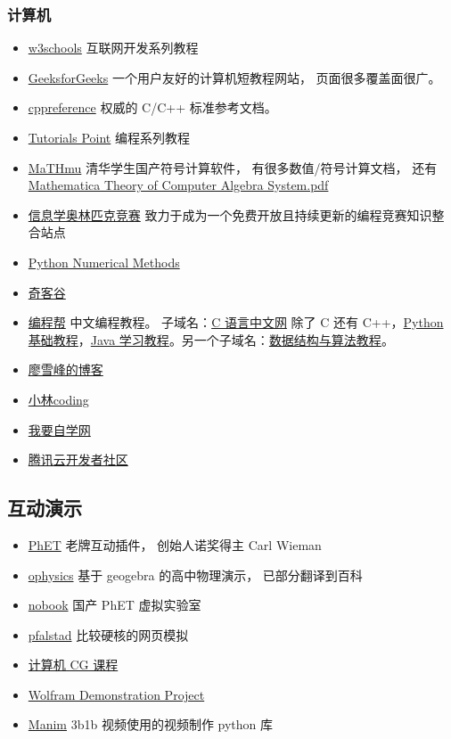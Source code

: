 \subsubsection{计算机}
\begin{itemize}
\item \href{https://www.w3schools.com}{w3schools} 互联网开发系列教程
\item \href{https://www.geeksforgeeks.org/}{GeeksforGeeks} 一个用户友好的计算机短教程网站， 页面很多覆盖面很广。
\item \href{https://cppreference.com}{cppreference} 权威的 C/C++ 标准参考文档。
\item \href{https://www.tutorialspoint.com/index.htm}{Tutorials Point} 编程系列教程
\item \href{http://mathmu.github.io/MTCAS/RecentChanges.html}{MaTHmu} 清华学生国产符号计算软件， 有很多数值/符号计算文档， 还有 \href{https://github.com/maTHmU/MTCAS}{Mathematica Theory of Computer Algebra System.pdf}
\item \href{https://oi-wiki.org}{信息学奥林匹克竞赛} 致力于成为一个免费开放且持续更新的编程竞赛知识整合站点
\item \href{https://pythonnumericalmethods.berkeley.edu/notebooks/Index.html}{Python Numerical Methods}
\item \href{https://www.qikegu.com}{奇客谷}
\item \href{http://www.biancheng.net/}{编程帮} 中文编程教程。 子域名：\href{http://c.biancheng.net}{C 语言中文网} 除了 C 还有 C++，\href{http://c.biancheng.net/python/}{Python 基础教程}，\href{http://c.biancheng.net/java/}{Java 学习教程}。另一个子域名：\href{http://data.biancheng.net/}{数据结构与算法教程}。
\item \href{https://www.liaoxuefeng.com}{廖雪峰的博客}
\item \href{https://xiaolincoding.com}{小林coding}
\item \href{https://www.51zxw.net}{我要自学网}
\item \href{https://cloud.tencent.com/developer}{腾讯云开发者社区}
\end{itemize}

\subsection{互动演示}
\begin{itemize}
\item \href{https://phet.colorado.edu}{PhET} 老牌互动插件， 创始人诺奖得主 Carl Wieman
\item \href{https://ophysics.com}{ophysics} 基于 geogebra 的高中物理演示， 已部分翻译到百科
\item \href{https://www.nobook.com}{nobook} 国产 PhET 虚拟实验室
\item \href{https://www.falstad.com}{pfalstad} 比较硬核的网页模拟
\item \href{http://www.cs.cornell.edu/courses/cs5643/2010sp}{计算机 CG 课程}
\item \href{https://demonstrations.wolfram.com/topics.php?PhysicalSciences#5}{Wolfram Demonstration Project}
\item \href{https://github.com/3b1b/manim}{Manim} 3b1b 视频使用的视频制作 python 库
\end{itemize}

